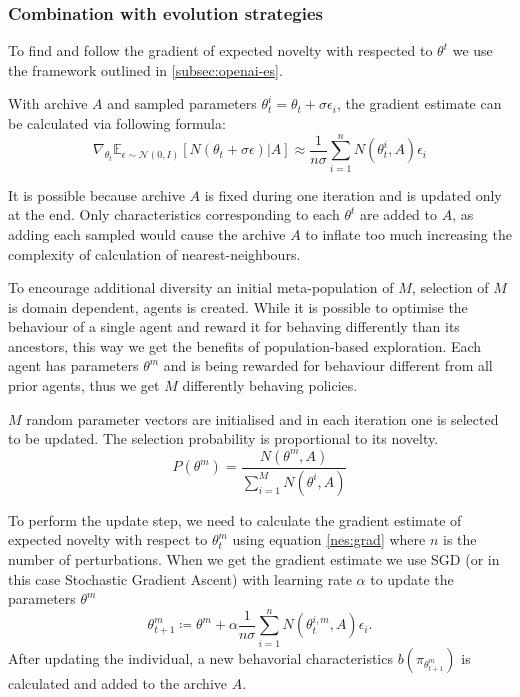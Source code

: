 \subsubsection{Combination with evolution strategies}

To find and follow the gradient of expected novelty with respected to $\theta^t$ we use the framework outlined in \ref{subsec:openai-es}. 

With archive $A$ and sampled parameters $\theta_t^i=\theta_t + \sigma\epsilon_i$, the gradient estimate can be calculated via following formula:
\begin{equation}
    \label{nes:grad}
    \nabla_{\theta_t}\mathbb{E}_{\epsilon\sim\mathcal{N}(0,I)} [ N(\theta_t + \sigma\epsilon)|A]\approx \frac{1}{n\sigma}\sum_{i=1}^n N(\theta_t^i,A)\epsilon_i 
\end{equation}

It is possible because archive $A$ is fixed during one iteration and is updated only at the end. Only characteristics corresponding to each $\theta^t$ are added to $A$, as adding each sampled would cause the archive $A$ to inflate too much increasing the complexity of calculation of nearest-neighbours.

To encourage additional diversity an initial meta-population of $M$, selection of $M$ is domain dependent, agents is created. While it is possible to optimise the behaviour of a single agent and reward it for behaving differently than its ancestors, this way we get the benefits of population-based exploration.  Each agent has parameters $\theta^m$ and is being rewarded for behaviour different from all prior agents, thus we get $M$ differently behaving policies.

$M$ random parameter vectors are initialised and in each iteration one is selected to be updated. The selection probability is proportional to its novelty.
\begin{equation}
    P(\theta^m) = \frac{N(\theta^m,A)}{\sum_{i=1}^M N(\theta^i,A)}
\end{equation}

To perform the update step, we need to calculate the gradient estimate of expected novelty with respect to $\theta^m_t$ using equation \ref{nes:grad} where $n$ is the number of perturbations. When we get the gradient estimate we use SGD (or in this case Stochastic Gradient Ascent) with learning rate $\alpha$ to update the parameters $\theta^m$
\begin{equation}
    \label{eq:ns-es-update}
    \theta^m_{t+1}\coloneqq\theta^m + \alpha \frac{1}{n\sigma}\sum_{i=1}^n N(\theta_t^{i,m},A)\epsilon_i.
\end{equation}
 After updating the individual, a new behavorial characteristics $b(\pi_{\theta^m_{t+1}})$ is calculated and added to the archive $A$. 

